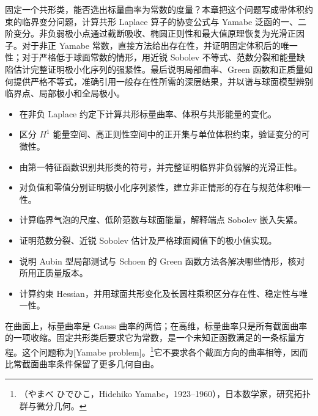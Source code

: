 
% 
% 


\begin{chapterabstract}
	固定一个共形类，能否选出标量曲率为常数的度量？本章把这个问题写成带体积约束的临界变分问题，计算共形 Laplace 算子的协变公式与 Yamabe 泛函的一、二阶变分。非负弱极小点通过截断吸收、椭圆正则性和最大值原理恢复为光滑正因子。对于非正 Yamabe 常数，直接方法给出存在性，并证明固定体积后的唯一性；对于严格低于球面常数的情形，用近锐 Sobolev 不等式、范数分裂和能量缺陷估计完整证明极小化序列的强紧性。最后说明局部曲率、Green 函数和正质量如何提供严格不等式，准确引用一般存在性所需的深层结果，并以谱与球面模型辨别临界点、局部极小和全局极小。
\end{chapterabstract}

\begin{learninggoals}
	\begin{itemize}
		\item 在非负 Laplace 约定下计算共形标量曲率、体积与共形能量的变化。
		\item 区分 \(H^1\) 能量空间、高正则性空间中的正开集与单位体积约束，验证变分的可微性。
		\item 由第一特征函数识别共形类的符号，并完整证明临界非负弱解的光滑正性。
		\item 对负值和零值分别证明极小化序列紧性，建立非正情形的存在与规范体积唯一性。
		\item 计算临界气泡的尺度、低阶范数与球面能量，解释端点 Sobolev 嵌入失紧。
		\item 证明范数分裂、近锐 Sobolev 估计及严格球面阈值下的极小值实现。
		\item 说明 Aubin 型局部测试与 Schoen 的 Green 函数方法各解决哪些情形，核对所用正质量版本。
		\item 计算约束 Hessian，并用球面共形变化及长圆柱乘积区分存在性、稳定性与唯一性。
	\end{itemize}
\end{learninggoals}

在曲面上，标量曲率是 Gauss 曲率的两倍；在高维，标量曲率只是所有截面曲率的一项收缩。固定共形类后要求它为常数，是一个未知正函数满足的一条标量方程。这个问题称为[Yamabe problem]。\footnote{（やまべ ひでひこ，Hidehiko Yamabe，1923--1960），日本数学家，研究拓扑群与微分几何。}它不要求各个截面方向的曲率相等，因而比常截面曲率条件保留了更多几何自由。

